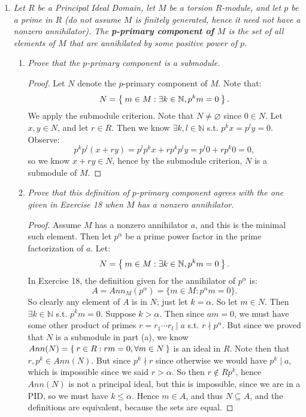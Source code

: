 \documentclass[12pt]{amsbook}
\theoremstyle{plain}
\numberwithin{section}{chapter}
\numberwithin{equation}{chapter}
\theoremstyle{definition}
\theoremstyle{remark}
\newcommand{\sub}{\subseteq}
\newcommand{\n}{\mathbb{N}}
\renewcommand{\leq}{\leqslant}
\begin{document}
\begin{enumerate}[label=\arabic*.]
  \begin{proof}
 $\forall i$, let $a_i = a/p_i^{r_i} (= \prod_{j \neq i}p_j^{r_j})$. Then $a_iM \sub M_i$, since $p_i^{r_i}(a_iM) = aM = 0$ (by assumptions of theorem). Then: 
 $$
 gcd(a_1,...,a_k) = 1,
 $$
 so there exists $c_1,...,c_k \in R$ s.t. $c_1a_1 + \cdots + c_ka_k = 1$. So $\forall u \in M$,
 $$
 u = c_1a_1u + \cdots + c_ka_ku \in M_1 + \cdots M_k.
 $$
 Now let $u \in M_i \cap (\sum_{j \neq i}M_j)$. Then $p_i^{r_i},a_i \in Ann(u)$. So, $(p_i^{r_i}) = (1) \sub Ann(u)$, so $u = 0$. So $\forall i,M_i \cap (\sum_{j \neq i}M_j) = 0$. 
 \end{proof}
 \setcounter{enumi}{21}
 \item \textit{Let $R$ be a Principal Ideal Domain, let $M$ be a torsion $R$-module, and let $p$ be a prime in $R$ (do not assume $M$ is finitely generated, hence it need not have a nonzero annihilator). The \textbf{p-primary component of $M$} is the set of all elements of $M$ that are annihilated by some positive power of $p$. }
 \begin{enumerate}
 \item \textit{Prove that the $p$-primary component is a submodule. }
 \begin{proof}
 Let $N$ denote the $p$-primary component of $M$. Note that: 
 $$
 N = \Set{m \in M: \exists k\in \n,p^km = 0}. 
 $$
We apply the submodule criterion. Note that $N \neq \varnothing$ since $0 \in N$. Let $x,y \in N$, and let $r \in R$. Then we know $\exists k,l \in \n$ s.t. $p^kx = p^ly = 0$. Observe: 
$$
p^kp^l(x + ry) = p^lp^kx + rp^kp^ly = p^l0 + rp^k0 = 0,
$$
so we know $x + ry \in N$, hence by the submodule criterion, $N$ is a submodule of $M$. 
 \end{proof}
 
 \item \textit{Prove that this definition of $p$-primary component agrees with the one given in Exercise 18 when $M$ has a nonzero annihilator. }
 \begin{proof}
 Assume $M$ has a nonzero annihilator $a$, and this is the minimal such element. Then let $p^\alpha$ be a prime power factor in the prime factorization of $a$. Let:
 $$
 N = \Set{m \in M: \exists k\in \n,p^km = 0}.
 $$
 In Exercise 18, the definition given for the annihilator of $p^\alpha$ is: 
 $$
 A = Ann_M(p^\alpha) = \{m \in M: p^\alpha m = 0\}.
 $$
 So clearly any element of $A$ is in $N$; just let $k =\alpha$. So let $m \in N$. Then $\exists k \in \n$ s.t. $p^km = 0$. Suppose $k > \alpha$. Then since $am = 0$, we must have some other product of primes $r = r_1\cdots r_l\mid a$ s.t. $r \nmid p^{\alpha}$. But since we proved that $N$ is a submodule in part (a), we know $Ann(N) = \Set{r \in R: rm = 0,\forall m \in N}$ is an ideal in $R$. Note then that $r,p^k \in Ann(N)$. But since $p^k \nmid r$ since otherwise we would have $p^k \mid a$, which is impossible since we said $r > \alpha$. So then $r \notin Rp^k$, hence $Ann(N)$ is not a principal ideal, but this is impossible, since we are in a PID, so we must have $k \leq \alpha$. Hence $m \in A$, and thus $N \sub A$, and the definitions are equivalent, because the sets are equal. 
 

\end{proof}
\end{enumerate}
\end{enumerate}
\end{document}
